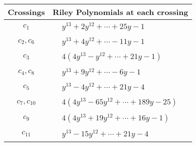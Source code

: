 \documentclass[1p]{elsarticle_modified}
\theoremstyle{definition}
\begin{document}
\begin{tabular}{m{50pt}|m{274pt}}
Crossings & \hspace{64pt}Riley Polynomials at each crossing \\
\hline $$\begin{aligned}c_{1}\end{aligned}$$&$\begin{aligned}
&y^{13}+2 y^{12}+\cdots+25 y-1
\end{aligned}$\\
\hline $$\begin{aligned}c_{2},c_{6}\end{aligned}$$&$\begin{aligned}
&y^{13}+4 y^{12}+\cdots-11 y-1
\end{aligned}$\\
\hline $$\begin{aligned}c_{3}\end{aligned}$$&$\begin{aligned}
&4(4 y^{13}- y^{12}+\cdots+21 y-1)
\end{aligned}$\\
\hline $$\begin{aligned}c_{4},c_{8}\end{aligned}$$&$\begin{aligned}
&y^{13}+9 y^{12}+\cdots-6 y-1
\end{aligned}$\\
\hline $$\begin{aligned}c_{5}\end{aligned}$$&$\begin{aligned}
&y^{13}-4 y^{12}+\cdots+21 y-4
\end{aligned}$\\
\hline $$\begin{aligned}c_{7},c_{10}\end{aligned}$$&$\begin{aligned}
&4(4 y^{13}-65 y^{12}+\cdots+189 y-25)
\end{aligned}$\\
\hline $$\begin{aligned}c_{9}\end{aligned}$$&$\begin{aligned}
&4(4 y^{13}+19 y^{12}+\cdots+16 y-1)
\end{aligned}$\\
\hline $$\begin{aligned}c_{11}\end{aligned}$$&$\begin{aligned}
&y^{13}-15 y^{12}+\cdots+21 y-4
\end{aligned}$\\
\hline
\end{tabular}\\~\\
\end{document}
